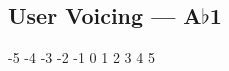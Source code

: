 \subsection{User Voicing --- \UiKey{\I}\UiKey{\SET}A$\flat$1}




































-5
-4
-3
-2
-1
0
1
2
3
4
5

